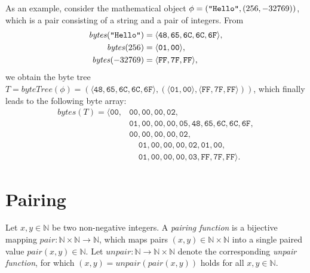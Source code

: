 \documentclass[bibtotoc,halfparskip,oneside]{scrreprt}
\newcommand{\hex}[1]{\ensuremath{\mathtt{#1}}}
\newcommand{\str}[1]{\ensuremath{\text{\texttt{"#1"}}}}
\begin{document}
As an example, consider the mathematical object $\phi=(\str{Hello},(256, -32769))$, which is a pair consisting of a string and a pair of integers. From
\begin{align*}
	\mathit{bytes}(\str{Hello})&=\langle\hex{48},\hex{65},\hex{6C},\hex{6C},\hex{6F}\rangle,\\
	\mathit{bytes}(256)&=\langle\hex{01},\hex{00}\rangle,\\
	\mathit{bytes}(-32769)&=\langle\hex{FF},\hex{7F},\hex{FF}\rangle,
\end{align*}
we obtain the byte tree $T=\mathit{byteTree}(\phi)=(\langle\hex{48},\hex{65},\hex{6C},\hex{6C},\hex{6F}\rangle,(\langle\hex{01},\hex{00}\rangle,\langle\hex{FF},\hex{7F},\hex{FF}\rangle))$, which finally leads to the following byte array:
\begin{align*}
\mathit{bytes}(T)=\langle\hex{00},&\hex{00},\hex{00},\hex{00},\hex{02},\\
	                              &\hex{01},\hex{00},\hex{00},\hex{00},\hex{05},\hex{48},\hex{65},\hex{6C},\hex{6C},\hex{6F},\\
	                              &\hex{00},\hex{00},\hex{00},\hex{00},\hex{02},\\
                                  &~~~~~\!\hex{01},\hex{00},\hex{00},\hex{00},\hex{02},\hex{01},\hex{00},\\
                                  &~~~~~\!\hex{01},\hex{00},\hex{00},\hex{00},\hex{03},\hex{FF},\hex{7F},\hex{FF}\rangle.
\end{align*}
\section{Pairing}

Let $x,y\in \mathbb{N}$ be two non-negative integers. A \emph{pairing function} is a bijective mapping $\mathit{pair}:\mathbb{N}\times\mathbb{N}\rightarrow\mathbb{N}$, which maps pairs $(x,y)\in\mathbb{N}\times\mathbb{N}$ into a single paired value $\mathit{pair}(x,y)\in\mathbb{N}$. Let $\mathit{unpair}:\mathbb{N}\rightarrow\mathbb{N}\times\mathbb{N}$ denote the corresponding \emph{unpair function}, for which $(x,y)=\mathit{unpair}(\mathit{pair}(x,y))$ holds for all $x,y\in \mathbb{N}$.
\end{document}
